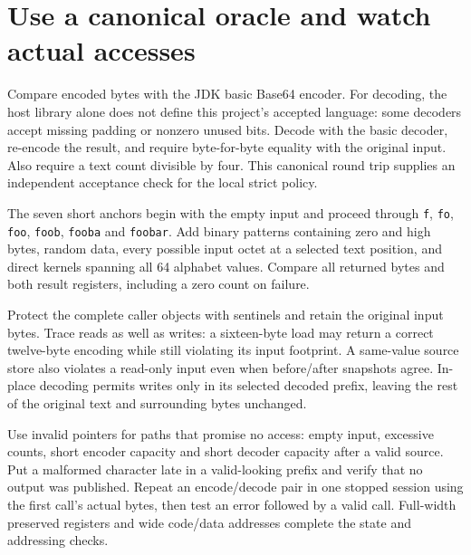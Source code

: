 \section{Use a canonical oracle and watch actual accesses}
Compare encoded bytes with the JDK basic Base64 encoder. For decoding, the host library
alone does not define this project's accepted language: some decoders accept missing
padding or nonzero unused bits. Decode with the basic decoder, re-encode the result,
and require byte-for-byte equality with the original input. Also require a text count
divisible by four. This canonical round trip supplies an independent acceptance check
for the local strict policy.

The seven short anchors begin with the empty input and proceed through \texttt{f},
\texttt{fo}, \texttt{foo}, \texttt{foob}, \texttt{fooba} and \texttt{foobar}. Add binary
patterns containing zero and high bytes, random data, every possible input octet at a
selected text position, and direct kernels spanning all 64 alphabet values. Compare
all returned bytes and both result registers, including a zero count on failure.

Protect the complete caller objects with sentinels and retain the original input bytes.
Trace reads as well as writes: a sixteen-byte load may return a correct twelve-byte
encoding while still violating its input footprint. A same-value source store also
violates a read-only input even when before/after snapshots agree. In-place decoding
permits writes only in its selected decoded prefix, leaving the rest of the original
text and surrounding bytes unchanged.

Use invalid pointers for paths that promise no access: empty input, excessive counts,
short encoder capacity and short decoder capacity after a valid source. Put a malformed
character late in a valid-looking prefix and verify that no output was published.
Repeat an encode/decode pair in one stopped session using the first call's actual
bytes, then test an error followed by a valid call. Full-width preserved registers and
wide code/data addresses complete the state and addressing checks.
